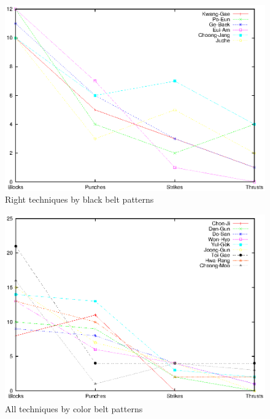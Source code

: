 \documentclass[10pt,twocolumn,a4paper]{article}
\begin{document}
  \begin{figure}
    \includegraphics[scale=0.72]{data/gnuplot/eps/patterns_black_right}
    \caption{Right techniques by black belt patterns}
    \label{fig:patterns_black_right}
  \end{figure}


  \begin{figure}
    \includegraphics[scale=0.72]{data/gnuplot/eps/patterns_color_all}
    \caption{All techniques by color belt patterns}
    \label{fig:patterns_color_all}
  \end{figure}
\end{document}
